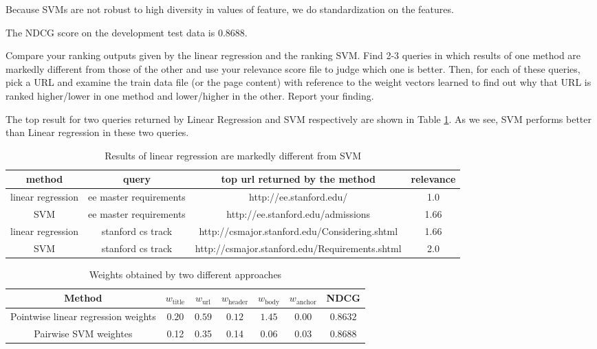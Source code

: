 Because SVMs are not robust to high diversity in values of feature,
we do standardization on the features.

The NDCG score on the development test data is $0.8688$.


Compare your ranking outputs given by the linear regression and the ranking SVM.
Find 2-3 queries in which results of one method are markedly different from those
of the other and use your relevance score file to judge which one is better.
Then, for each of these queries, pick a URL and examine the train data file (or the
page content) with reference to the weight vectors learned to find out why that
URL is ranked higher/lower in one method and lower/higher in the other. Report
your finding.

The top result for two queries returned by Linear Regression and SVM respectively are shown in Table \ref{tab:rel}. As we see, SVM performs better than Linear regression in these two queries.


\begin{table}[h!]
\begin{center}
\begin{tabular}{|c|c|c|c|}
  \hline

 method & query & top url returned by the method & relevance \\  \hline
linear regression & ee master requirements &  http://ee.stanford.edu/  & 1.0 \\\hline
SVM & ee master requirements  & http://ee.stanford.edu/admissions & 1.66 \\\hline
linear regression & stanford cs track &  http://csmajor.stanford.edu/Considering.shtml &
1.66 \\\hline
SVM & stanford cs track &  http://csmajor.stanford.edu/Requirements.shtml & 2.0 \\\hline
\end{tabular}
\caption{Results of linear regression are markedly different from SVM}\label{tab:rel}
\end{center}
\end{table}

\begin{table}[h!]
\begin{center}
\begin{tabular}{|c|c|c|c|c|c|c|}
  \hline
  Method & $w_\textrm{title}$ & $w_\textrm{url}$ & $w_\textrm{header}$ & $w_\textrm{body}$ & $w_\textrm{anchor}$ & NDCG \\
  \hline
  Pointwise linear regression weights & $0.20$ & $0.59$ & $0.12$ & $1.45$ & $0.00$ & $0.8632$ \\
  \hline
  Pairwise SVM weightes & 0.12  &  0.35 &  0.14 &  0.06 &  0.03 &  0.8688 \\
  \hline
\end{tabular}
\caption{Weights obtained by two different approaches}\label{tab:wtt}
\end{center}
\end{table}


